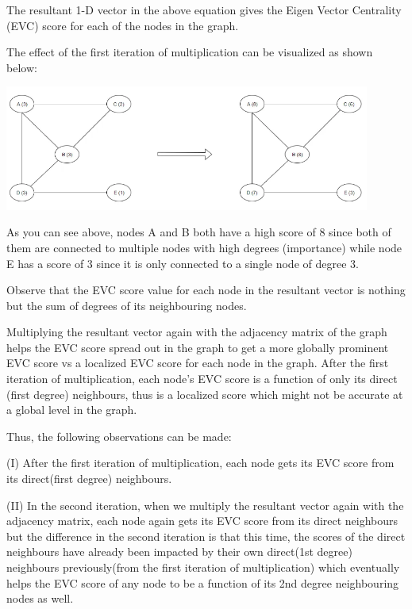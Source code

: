 \documentclass[12pt, a4paper]{report}
\begin{document}
\begin{itemize}
    The resultant 1-D vector in the above equation gives the Eigen Vector Centrality (EVC) score for each of the nodes in the graph.

    The effect of the first iteration of multiplication can be visualized as shown below:

    \includegraphics[width=0.9\textwidth,center]{Transform}

    As you can see above, nodes A and B both have a high score of 8 since both of them are connected to multiple nodes with high degrees (importance) while node E has a score of 3 since it is only connected to a single node of degree 3.
    
    Observe that the EVC score value for each node in the resultant vector is nothing but the sum of degrees of its neighbouring nodes.
    
    Multiplying the resultant vector again with the adjacency matrix of the graph helps the EVC score spread out in the graph to get a more globally prominent EVC score vs a localized EVC score for each node in the graph. After the first iteration of multiplication, each node’s EVC score is a function of only its direct (first degree) neighbours, thus is a localized score which might not be accurate at a global level in the graph.

    Thus, the following observations can be made:
    
    (I)     After the first iteration of multiplication, each node gets its EVC score from its direct(first degree) neighbours.
    
    (II)	In the second iteration, when we multiply the resultant vector again with the adjacency matrix, each node again gets its EVC score from its direct neighbours but the difference in the second iteration is that this time, the scores of the direct neighbours have already been impacted by their own direct(1st degree) neighbours previously(from the first iteration of multiplication) which eventually helps the EVC score of any node to be a function of its 2nd degree neighbouring nodes as well.
    

\end{itemize}
\end{document}
